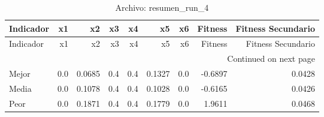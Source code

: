 \begin{longtable}{lrrrrrrrr}
\caption{Archivo: resumen\_run\_4}\label{tab:resumen_run_4} \\
\toprule
Indicador & x1 & x2 & x3 & x4 & x5 & x6 & Fitness & Fitness Secundario \\
\midrule
\endfirsthead
\toprule
Indicador & x1 & x2 & x3 & x4 & x5 & x6 & Fitness & Fitness Secundario \\
\midrule
\endhead
\midrule
\multicolumn{9}{r}{Continued on next page} \\
\midrule
\endfoot
\bottomrule
\endlastfoot
Mejor & 0.0 & 0.0685 & 0.4 & 0.4 & 0.1327 & 0.0 & -0.6897 & 0.0428 \\
Media & 0.0 & 0.1078 & 0.4 & 0.4 & 0.1028 & 0.0 & -0.6165 & 0.0426 \\
Peor & 0.0 & 0.1871 & 0.4 & 0.4 & 0.1779 & 0.0 & 1.9611 & 0.0468 \\
\end{longtable}